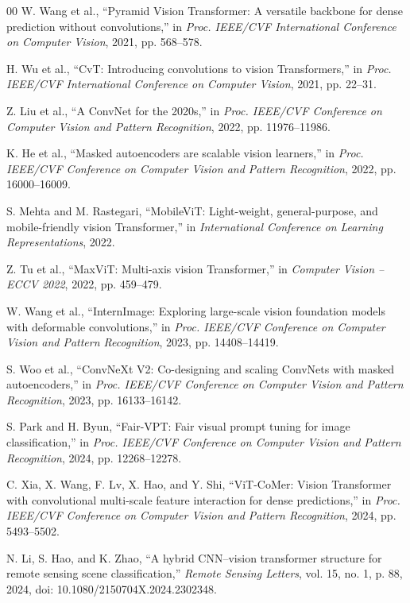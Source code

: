 \documentclass[conference]{IEEEtran}
\begin{document}
\begin{thebibliography}{00}
W. Wang et al., ``Pyramid Vision Transformer: A versatile backbone for dense prediction without convolutions,'' in \textit{Proc. IEEE/CVF International Conference on Computer Vision}, 2021, pp. 568--578.

H. Wu et al., ``CvT: Introducing convolutions to vision Transformers,'' in \textit{Proc. IEEE/CVF International Conference on Computer Vision}, 2021, pp. 22--31.

Z. Liu et al., ``A ConvNet for the 2020s,'' in \textit{Proc. IEEE/CVF Conference on Computer Vision and Pattern Recognition}, 2022, pp. 11976--11986.

K. He et al., ``Masked autoencoders are scalable vision learners,'' in \textit{Proc. IEEE/CVF Conference on Computer Vision and Pattern Recognition}, 2022, pp. 16000--16009.

S. Mehta and M. Rastegari, ``MobileViT: Light-weight, general-purpose, and mobile-friendly vision Transformer,'' in \textit{International Conference on Learning Representations}, 2022.

Z. Tu et al., ``MaxViT: Multi-axis vision Transformer,'' in \textit{Computer Vision -- ECCV 2022}, 2022, pp. 459--479.

W. Wang et al., ``InternImage: Exploring large-scale vision foundation models with deformable convolutions,'' in \textit{Proc. IEEE/CVF Conference on Computer Vision and Pattern Recognition}, 2023, pp. 14408--14419.

S. Woo et al., ``ConvNeXt V2: Co-designing and scaling ConvNets with masked autoencoders,'' in \textit{Proc. IEEE/CVF Conference on Computer Vision and Pattern Recognition}, 2023, pp. 16133--16142.

S. Park and H. Byun, ``Fair-VPT: Fair visual prompt tuning for image classification,'' in \textit{Proc. IEEE/CVF Conference on Computer Vision and Pattern Recognition}, 2024, pp. 12268--12278.

C. Xia, X. Wang, F. Lv, X. Hao, and Y. Shi, ``ViT-CoMer: Vision Transformer with convolutional multi-scale feature interaction for dense predictions,'' in \textit{Proc. IEEE/CVF Conference on Computer Vision and Pattern Recognition}, 2024, pp. 5493--5502.

N. Li, S. Hao, and K. Zhao, ``A hybrid CNN--vision transformer structure for remote sensing scene classification,'' \textit{Remote Sensing Letters}, vol. 15, no. 1, p. 88, 2024, doi: 10.1080/2150704X.2024.2302348.


\end{thebibliography}
\end{document}
